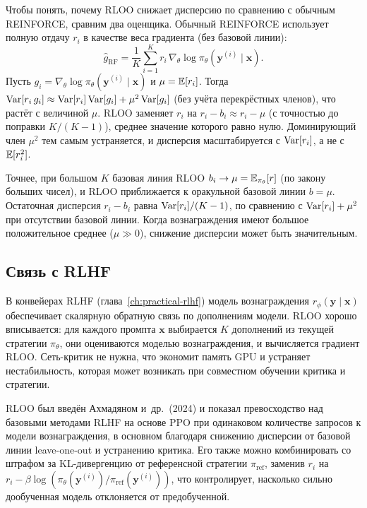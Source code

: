 
Чтобы понять, почему RLOO снижает дисперсию по сравнению с обычным REINFORCE, сравним два оценщика. Обычный REINFORCE использует полную отдачу $r_i$ в качестве веса градиента (без базовой линии):
\[
\hat g_{\text{RF}} = \frac{1}{K}\sum_{i=1}^K r_i\, \nabla_\theta \log \pi_\theta(\mathbf{y}^{(i)} \mid \mathbf{x}).
\]
Пусть $g_i = \nabla_\theta \log \pi_\theta(\mathbf{y}^{(i)} \mid \mathbf{x})$ и $\mu = \operatorname{\mathbb{E}}[r_i]$. Тогда $\operatorname{Var}[r_i\, g_i] \approx \operatorname{Var}[r_i] \operatorname{Var}[g_i] + \mu^2 \operatorname{Var}[g_i]$ (без учёта перекрёстных членов), что растёт с величиной $\mu$. RLOO заменяет $r_i$ на $r_i - b_i \approx r_i - \mu$ (с точностью до поправки $K/(K-1)$), среднее значение которого равно нулю. Доминирующий член $\mu^2$ тем самым устраняется, и дисперсия масштабируется с $\operatorname{Var}[r_i]$, а не с $\operatorname{\mathbb{E}}[r_i^2]$.

Точнее, при большом $K$ базовая линия RLOO $b_i \to \mu = \operatorname{\mathbb{E}}_{\pi_\theta}[r]$ (по закону больших чисел), и RLOO приближается к оракульной базовой линии $b = \mu$. Остаточная дисперсия $r_i - b_i$ равна $\operatorname{Var}[r_i] / (K-1)$, по сравнению с $\operatorname{Var}[r_i] + \mu^2$ при отсутствии базовой линии. Когда вознаграждения имеют большое положительное среднее ($\mu \gg 0$), снижение дисперсии может быть значительным.

\subsection{Связь с RLHF}


В конвейерах RLHF (глава~\ref{ch:practical-rlhf}) модель вознаграждения $r_\phi(\mathbf{y} \mid \mathbf{x})$ обеспечивает скалярную обратную связь по дополнениям модели. RLOO хорошо вписывается: для каждого промпта $\mathbf{x}$ выбирается $K$ дополнений из текущей стратегии $\pi_\theta$, они оцениваются моделью вознаграждения, и вычисляется градиент RLOO. Сеть-критик не нужна, что экономит память GPU и устраняет нестабильность, которая может возникать при совместном обучении критика и стратегии.

RLOO был введён Ахмадяном и~др.\ (2024) и показал превосходство над базовыми методами RLHF на основе PPO при одинаковом количестве запросов к модели вознаграждения, в основном благодаря снижению дисперсии от базовой линии leave-one-out и устранению критика. Его также можно комбинировать со штрафом за KL-дивергенцию от референсной стратегии $\pi_{\text{ref}}$, заменив $r_i$ на $r_i - \beta \log(\pi_\theta(\mathbf{y}^{(i)}) / \pi_{\text{ref}}(\mathbf{y}^{(i)}))$, что контролирует, насколько сильно дообученная модель отклоняется от предобученной.

